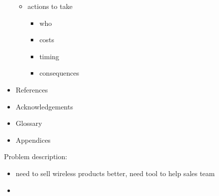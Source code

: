 \documentclass[12pt]{article}
\begin{document}
\begin{itemize}
        \begin{itemize}
            \item actions to take
            \begin{itemize}
                \item who
                \item costs
                \item timing
                \item consequences
            \end{itemize}
        \end{itemize}
        \item References
        \item Acknowledgements
        \item Glossary
        \item Appendices
    \end{itemize}


    Problem description:
    \begin{itemize}
        \item need to sell wireless products better, need tool to help sales team
        \item
    \end{itemize}
\end{document}
